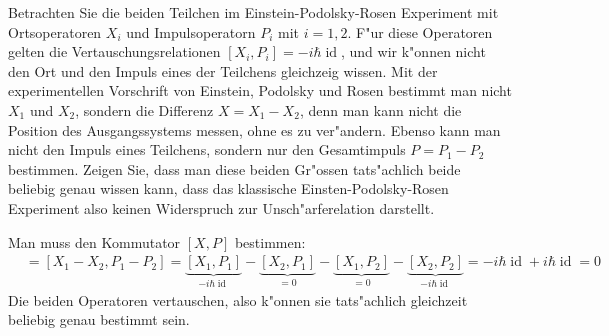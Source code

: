 Betrachten Sie die beiden Teilchen im Einstein-Podolsky-Rosen Experiment
mit Ortsoperatoren $X_i$ und Impulsoperatorn $P_i$ mit $i=1,2$.
F"ur diese Operatoren gelten die Vertauschungsrelationen
$[X_i,P_i]=-i\hbar\operatorname{id}$, und wir k"onnen nicht
den Ort und den Impuls eines der Teilchens gleichzeig wissen.
Mit der experimentellen Vorschrift von Einstein, Podolsky und Rosen
bestimmt man nicht $X_1$ und $X_2$, sondern
die Differenz $X=X_1-X_2$, denn man kann nicht die Position des
Ausgangssystems messen, ohne es zu ver"andern. Ebenso kann man nicht
den Impuls eines Teilchens, sondern nur den Gesamtimpuls $P=P_1-P_2$ 
bestimmen. Zeigen Sie, dass man diese beiden Gr"ossen tats"achlich
beide beliebig genau wissen kann, dass das klassische Einsten-Podolsky-Rosen
Experiment also keinen Widerspruch zur Unsch"arferelation darstellt.

\begin{loesung}
Man muss den Kommutator $[X,P]$ bestimmen:
\begin{align*}
[X,P]
&=
[X_1-X_2,P_1-P_2]
=
\underbrace{[X_1,P_1]}_{-i\hbar\operatorname{id}}
-\underbrace{[X_2,P_1]}_{=0}
-\underbrace{[X_1,P_2]}_{=0}
-\underbrace{[X_2,P_2]}_{-i\hbar\operatorname{id}}
=
-i\hbar\operatorname{id}
+i\hbar\operatorname{id}
=0
\end{align*}
Die beiden Operatoren vertauschen, also k"onnen sie tats"achlich gleichzeit
beliebig genau bestimmt sein.
\end{loesung}


